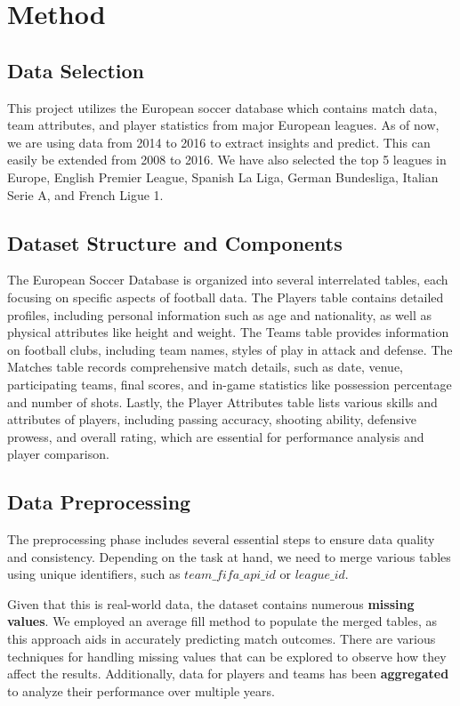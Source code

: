 \documentclass{article}
\begin{document}
\section{Method}

\subsection{Data Selection}
This project utilizes the European soccer database which contains match data, team attributes, and player statistics from major European leagues. As of now, we are using data from 2014 to 2016 to extract insights and predict. This can easily be extended from 2008 to 2016. We have also selected the top 5 leagues in Europe, English Premier League, Spanish La Liga, German Bundesliga, Italian Serie A, and French Ligue 1.

\subsection{Dataset Structure and Components}

The European Soccer Database is organized into several interrelated tables, each focusing on specific aspects of football data. The Players table contains detailed profiles, including personal information such as age and nationality, as well as physical attributes like height and weight. The Teams table provides information on football clubs, including team names, styles of play in attack and defense. The Matches table records comprehensive match details, such as date, venue, participating teams, final scores, and in-game statistics like possession percentage and number of shots. Lastly, the Player Attributes table lists various skills and attributes of players, including passing accuracy, shooting ability, defensive prowess, and overall rating, which are essential for performance analysis and player comparison.

\subsection{Data Preprocessing}
The preprocessing phase includes several essential steps to ensure data quality and consistency. Depending on the task at hand, we need to merge various tables using unique identifiers, such as $team\_fifa\_api\_id$ or $league\_id$.

Given that this is real-world data, the dataset contains numerous \textbf{missing values}. We employed an average fill method to populate the merged tables, as this approach aids in accurately predicting match outcomes. There are various techniques for handling missing values that can be explored to observe how they affect the results. Additionally, data for players and teams has been \textbf{aggregated} to analyze their performance over multiple years.
\end{document}
